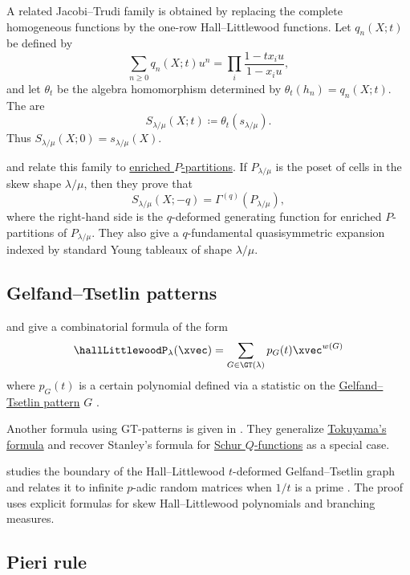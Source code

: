 A related Jacobi--Trudi family is obtained by replacing the complete
homogeneous functions by the one-row Hall--Littlewood functions.  Let
$q_n(X;t)$ be defined by
\[
\sum_{n\geq 0} q_n(X;t)u^n =
\prod_i \frac{1-tx_i u}{1-x_i u},
\]
and let $\theta_t$ be the algebra homomorphism determined by
$\theta_t(h_n)=q_n(X;t)$.  The
\label{hallLittlewoodSFunction}
are
\[
S_{\lambda/\mu}(X;t) \coloneqq \theta_t(s_{\lambda/\mu}).
\]
Thus $S_{\lambda/\mu}(X;0)=s_{\lambda/\mu}(X)$.

 and 
\cite{GrinbergVassilieva2024x} relate this family to
\hyperref[enrichedPPartitions]{enriched $P$-partitions}.  If
$P_{\lambda/\mu}$ is the poset of cells in the skew shape $\lambda/\mu$, then
they prove that
\[
S_{\lambda/\mu}(X;-q)=\Gamma^{(q)}(P_{\lambda/\mu}),
\]
where the right-hand side is the $q$-deformed generating function for enriched
$P$-partitions of $P_{\lambda/\mu}$.  They also give a
$q$-fundamental quasisymmetric expansion indexed by standard Young tableaux of
shape $\lambda/\mu$.

\subsection[hallLittlewoodGT]{Gelfand--Tsetlin patterns}


 and  give a combinatorial formula of
the form
\begin{equation}
 \hallLittlewoodP_\lambda(\xvec) = \sum_{G \in \GT(\lambda) } p_G(t) \xvec^{w(G)}
\end{equation}
where $p_G(t)$ is a certain polynomial defined
via a statistic on the \hyperref[gtpatterns]{Gelfand--Tsetlin pattern} $G$
\cite{FeiginMakhlin2016}.

Another formula using GT-patterns is given in \cite[Thm.~11]{GuptaRoyPeski2015}.
They generalize \hyperref[gtpatternsTokuyama]{Tokuyama's formula}
\cite{Tokuyama1988} and recover Stanley's formula \cite{Stanley1986} for
\hyperref[schurQ]{Schur $Q$-functions} as a special case.

 studies the boundary of the Hall--Littlewood
$t$-deformed Gelfand--Tsetlin graph and relates it to infinite $p$-adic random
matrices when $1/t$ is a prime \cite{Peski2021x}.  The proof uses explicit
formulas for skew Hall--Littlewood polynomials and branching measures.


\subsection[hallLittlewoodPieri]{Pieri rule}

